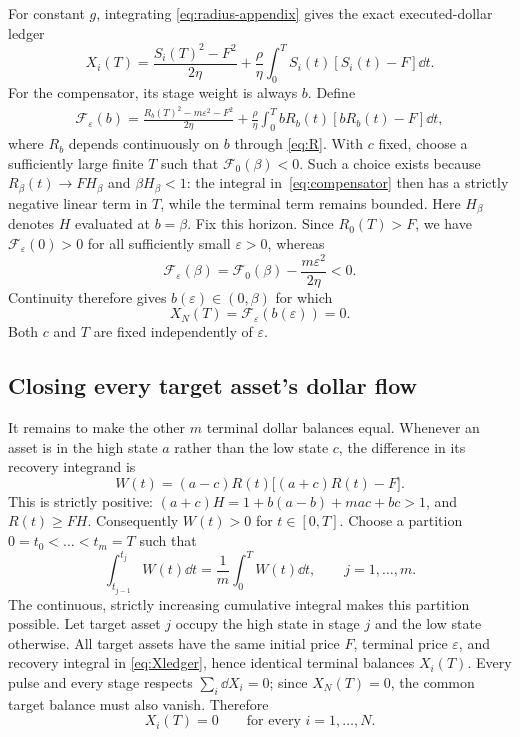 \documentclass[review,hidelinks,onefignum,onetabnum]{siamonline250211}
\begin{document}
For constant $g$, integrating \eqref{eq:radius-appendix} gives the exact executed-dollar ledger
\begin{equation}\label{eq:Xledger}
X_i(T)=\frac{S_i(T)^2-F^2}{2\eta}
+\frac\rho\eta\int_0^T S_i(t)[S_i(t)-F]\dd t.
\end{equation}
For the compensator, its stage weight is always $b$. Define
\begin{align}\label{eq:compensator}
\mathcal F_\varepsilon(b)=\frac{R_b(T)^2-m\varepsilon^2-F^2}{2\eta}
+\frac\rho\eta\int_0^T bR_b(t)[bR_b(t)-F]\dd t,
\end{align}
where $R_b$ depends continuously on $b$ through \eqref{eq:R}. With $c$ fixed, choose a sufficiently large finite $T$ such that $\mathcal F_0(\beta)<0$. Such a choice exists because $R_\beta(t)\to FH_\beta$ and $\beta H_\beta<1$: the integral in~\eqref{eq:compensator} then has a strictly negative linear term in $T$, while the terminal term remains bounded. Here $H_\beta$ denotes $H$ evaluated at $b=\beta$. Fix this horizon. Since $R_0(T)>F$, we have $\mathcal F_\varepsilon(0)>0$ for all sufficiently small $\varepsilon>0$, whereas
\[
\mathcal F_\varepsilon(\beta)=\mathcal F_0(\beta)-\frac{m\varepsilon^2}{2\eta}<0.
\]
Continuity therefore gives $b(\varepsilon)\in(0,\beta)$ for which
\[
X_N(T)=\mathcal F_\varepsilon(b(\varepsilon))=0.
\]
Both $c$ and $T$ are fixed independently of $\varepsilon$.

\subsection{Closing every target asset's dollar flow}
It remains to make the other $m$ terminal dollar balances equal. Whenever an asset is in the high state $a$ rather than the low state $c$, the difference in its recovery integrand is
\begin{equation}\label{eq:W}
W(t)=(a-c)R(t)\big[(a+c)R(t)-F\big].
\end{equation}
This is strictly positive: $(a+c)H=1+b(a-b)+mac+bc>1$, and $R(t)\ge FH$. Consequently $W(t)>0$ for $t\in[0,T]$. Choose a partition $0=t_0<\dots<t_m=T$ such that
\begin{equation}\label{eq:weights}
\int_{t_{j-1}}^{t_j}W(t)\dd t=\frac1m\int_0^T W(t)\dd t,
\qquad j=1,\ldots,m.
\end{equation}
The continuous, strictly increasing cumulative integral makes this partition possible. Let target asset $j$ occupy the high state in stage $j$ and the low state otherwise. All target assets have the same initial price $F$, terminal price $\varepsilon$, and recovery integral in \eqref{eq:Xledger}, hence identical terminal balances $X_i(T)$. Every pulse and every stage respects $\sum_i\dd X_i=0$; since $X_N(T)=0$, the common target balance must also vanish. Therefore
\begin{equation}\label{eq:allclosed}
X_i(T)=0\qquad\text{for every } i=1,\ldots,N.
\end{equation}
\end{document}
